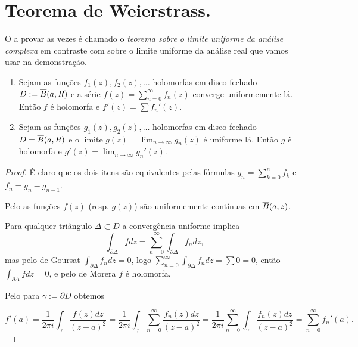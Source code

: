 \section{Teorema de Weierstrass.}


O  a provar as vezes é chamado
o \emph{teorema sobre o limite uniforme da análise complexa}
em contraste com  sobre o limite uniforme da análise real
que vamos usar na demonstração.

\begin{lema}
\label{l:uniforme}
\begin{enumerate}
\item
Sejam as funções $f_1(z),f_2(z),\dots$ holomorfas em disco fechado
$D := \overline{B}(a,R)$ e a série $f(z) = \sum_{n=0}^\infty f_n(z)$ converge uniformemente lá.
Então $f$ é holomorfa e $f'(z) = \sum f_n'(z)$.
\item
Sejam as funções $g_1(z),g_2(z),\dots$ holomorfas em disco fechado
$D = \overline{B}(a,R)$ e o limite $g(z) = \lim_{n\to\infty} g_n(z)$ é uniforme lá.
Então $g$ é holomorfa e $g'(z) = \lim_{n\to\infty} g_n'(z)$.
\end{enumerate}
\end{lema}
\begin{proof}
É claro que os dois itens são equivalentes pelas fórmulas
$g_n = \sum_{k=0}^n f_k$ e $f_n = g_n - g_{n-1}$.

Pelo 
as funções $f(z)$ (resp. $g(z)$) são uniformemente contínuas em $\overline{B}(a,z)$.

Para qualquer triângulo $\Delta \subset D$ a convergência uniforme implica
\[ \int_{\partial \Delta} f dz = \sum_{n=0}^\infty \int_{\partial \Delta} f_n dz, \]
mas pelo  de Goursat $\int_{\partial \Delta} f_n dz = 0$,
logo $\sum_{n=0}^\infty \int_{\partial \Delta} f_n dz = \sum 0 = 0$,
então $\int_{\partial \Delta} f dz = 0$,
e pelo  de Morera $f$ é holomorfa.

Pelo  para $\gamma := \partial D$ obtemos

\[ f'(a) = \frac1{2\pi i} \int_{\gamma} \frac{f(z)dz}{(z-a)^2}
= \frac1{2\pi i} \int_{\gamma} \sum_{n=0}^\infty \frac{f_n(z)dz}{(z-a)^2}
= \frac1{2\pi i} \sum_{n=0}^\infty \int_{\gamma} \frac{f_n(z)dz}{(z-a)^2}
= \sum_{n=0}^\infty f_n'(a). \]
\end{proof}

